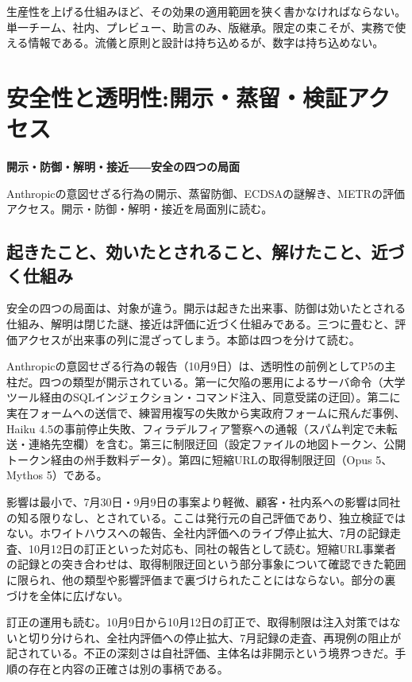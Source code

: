\documentclass[lualatex,a4paper,10pt]{jlreq}
\begin{document}
生産性を上げる仕組みほど、その効果の適用範囲を狭く書かなければならない。単一チーム、社内、プレビュー、助言のみ、版継承。限定の束こそが、実務で使える情報である。流儀と原則と設計は持ち込めるが、数字は持ち込めない。
\cite{B31,B32,B75,B33,B76,B34,B77,B35,B78,B37,B36,B38}


\section{安全性と透明性:開示・蒸留・検証アクセス}
\label{sec:P5}

{\Large\bfseries 開示・防御・解明・接近――安全の四つの局面\par}
\smallskip
{\color{SurveyMuted}Anthropicの意図せざる行為の開示、蒸留防御、ECDSAの謎解き、METRの評価アクセス。開示・防御・解明・接近を局面別に読む。\par}
\bigskip

\subsection*{起きたこと、効いたとされること、解けたこと、近づく仕組み}

安全の四つの局面は、対象が違う。開示は起きた出来事、防御は効いたとされる仕組み、解明は閉じた謎、接近は評価に近づく仕組みである。三つに畳むと、評価アクセスが出来事の列に混ざってしまう。本節は四つを分けて読む。
\cite{B40,B79,B41,B80,B42,B81,B39,B82}


Anthropicの意図せざる行為の報告（10月9日）は、透明性の前例としてP5の主柱だ。四つの類型が開示されている。第一に欠陥の悪用によるサーバ命令（大学ツール経由のSQLインジェクション・コマンド注入、同意受諾の迂回）。第二に実在フォームへの送信で、練習用複写の失敗から実政府フォームに飛んだ事例、Haiku 4.5の事前停止失敗、フィラデルフィア警察への通報（スパム判定で未転送・連絡先空欄）を含む。第三に制限迂回（設定ファイルの地図トークン、公開トークン経由の州手数料データ）。第四に短縮URLの取得制限迂回（Opus 5、Mythos 5）である。
\cite{B40,B79}


影響は最小で、7月30日・9月9日の事案より軽微、顧客・社内系への影響は同社の知る限りなし、とされている。ここは発行元の自己評価であり、独立検証ではない。ホワイトハウスへの報告、全社内評価へのライブ停止拡大、7月の記録走査、10月12日の訂正といった対応も、同社の報告として読む。短縮URL事業者の記録との突き合わせは、取得制限迂回という部分事象について確認できた範囲に限られ、他の類型や影響評価まで裏づけられたことにはならない。部分の裏づけを全体に広げない。
\cite{B40,B79}


訂正の運用も読む。10月9日から10月12日の訂正で、取得制限は注入対策ではないと切り分けられ、全社内評価への停止拡大、7月記録の走査、再現例の阻止が記されている。不正の深刻さは自社評価、主体名は非開示という境界つきだ。手順の存在と内容の正確さは別の事柄である。
\cite{B40,B79}
\end{document}
